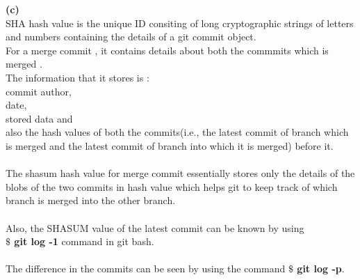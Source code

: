 \documentclass{article}
\theoremstyle{definition}
\begin{document}
\textbf{(c)}\\
SHA hash value is the unique ID consiting of long cryptographic strings of letters and numbers containing the details of a git commit object.\\
For a merge commit , it contains details about both the commmits which is merged .
\\The information that it stores is :\\
commit author, \\date,\\ stored data and \\also the hash values of both the commits(i.e., the latest commit of branch which is merged and the latest commit of branch into which it is merged) before it.\\\\
The shasum hash value for merge commit essentially stores only the details of the blobs of the two commits in hash value which helps git to keep track of which branch is merged into the other branch.\\\\

Also, the SHASUM value of the latest commit can be known by using \\
\textbf{$ \$ $ git log -1} command in git bash.\\\\
The difference in the commits can be seen by using the command \textbf{$ \$ $ git log -p}.\\
\end{document}

